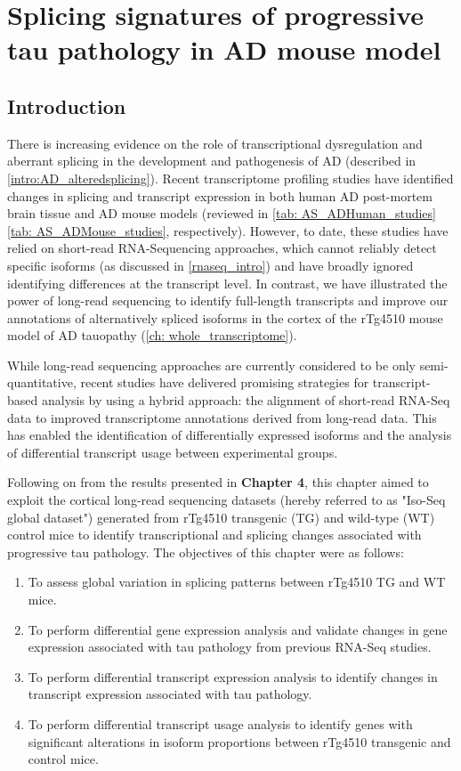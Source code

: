\chapter{Splicing signatures of progressive tau pathology in AD mouse model}\label{ch: transcriptional_global_differences}

\section{Introduction}
There is increasing evidence on the role of transcriptional dysregulation and aberrant splicing in the development and pathogenesis of AD (described in \cref{intro:AD_alteredsplicing}). Recent transcriptome profiling studies have identified changes in splicing and transcript expression in both human AD post-mortem brain tissue and AD mouse models (reviewed in \cref{tab: AS_ADHuman_studies} \cref{tab: AS_ADMouse_studies}, respectively). However, to date, these studies have relied on short-read RNA-Sequencing approaches, which cannot reliably detect specific isoforms (as discussed in \cref{rnaseq_intro}) and have broadly ignored identifying differences at the transcript level. In contrast, we have illustrated the power of long-read sequencing to identify full-length transcripts and improve our annotations of alternatively spliced isoforms in the cortex of the rTg4510 mouse model of AD tauopathy (\cref{ch: whole_transcriptome}). 

While long-read sequencing approaches are currently considered to be only semi-quantitative, recent studies have delivered promising strategies for transcript-based analysis by using a hybrid approach\cite{Tseng2021}: the alignment of short-read RNA-Seq data to improved transcriptome annotations derived from long-read data. This has enabled the identification of differentially expressed isoforms and the analysis of differential transcript usage between experimental groups\cite{Tseng2021}. 

Following on from the results presented in \textbf{Chapter 4}, this chapter aimed to exploit the cortical long-read sequencing datasets (hereby referred to as "Iso-Seq global dataset") generated from rTg4510 transgenic (TG) and wild-type (WT) control mice to identify transcriptional and splicing changes associated with progressive tau pathology. The objectives of this chapter were as follows: 
\begin{enumerate}
	\item To assess global variation in splicing patterns between rTg4510 TG and WT mice.
	\item To perform differential gene expression analysis and validate changes in gene expression associated with tau pathology from previous RNA-Seq studies. 
	\item To perform differential transcript expression analysis to identify changes in transcript expression associated with tau pathology.   
	\item To perform differential transcript usage analysis to identify genes with significant alterations in isoform proportions between rTg4510 transgenic and control mice. 
\end{enumerate} 

